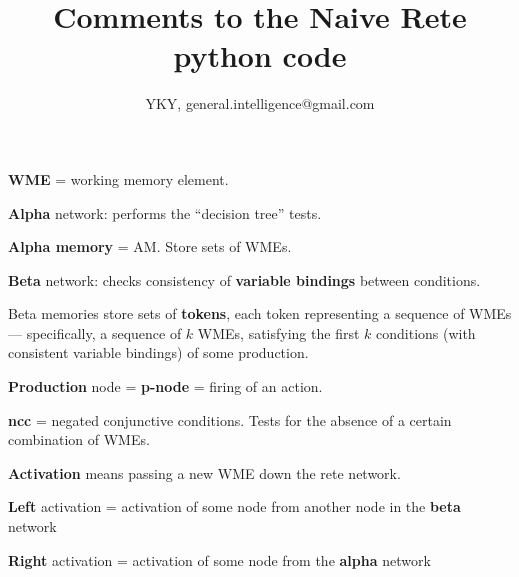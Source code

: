 

\usepackage[CJKspace]{xeCJK}
\usepackage{color}

\usepackage{mathtools}
\usepackage{hyperref}

\title{Comments to the Naive Rete python code}
\author{YKY, general.intelligence@gmail.com}


\maketitle

\textbf{WME} = working memory element.

\textbf{Alpha} network: performs the ``decision tree'' tests.

\textbf{Alpha memory} = AM.  Store sets of WMEs.

\textbf{Beta} network: checks consistency of \textbf{variable bindings} between conditions.

Beta memories store sets of \textbf{tokens}, each token representing a sequence of WMEs --- specifically, a sequence of $k$ WMEs, satisfying the first $k$ conditions (with consistent variable bindings) of some production.

\textbf{Production} node = \textbf{p-node} = firing of an action.

\textbf{ncc} = negated conjunctive conditions.  Tests for the absence of a certain combination of WMEs.

\textbf{Activation} means passing a new WME down the rete network.

\textbf{Left} activation = activation of some node from another node in the \textbf{beta} network

\textbf{Right} activation = activation of some node from the \textbf{alpha} network


